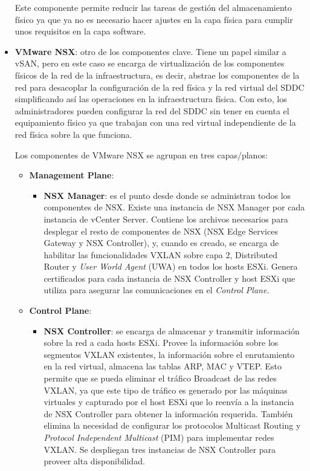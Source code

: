 \begin{itemize}
    Este componente permite reducir las tareas de gestión del almacenamiento físico ya que ya no es necesario hacer ajustes en la capa física para cumplir unos requisitos en la capa software.
    \item \textbf{VMware NSX}: otro de los componentes clave. Tiene un papel similar a vSAN, pero en este caso se encarga de virtualización de los componentes físicos de la red de la infraestructura, es decir, abstrae los componentes de la red para desacoplar la configuración de la red física y la red virtual del SDDC simplificando así las operaciones en la infraestructura física. Con esto, los administradores pueden configurar la red del SDDC sin tener en cuenta el equipamiento físico ya que trabajan con una red virtual independiente de la red física sobre la que funciona.

    Los componentes de VMware NSX se agrupan en tres capas/planos\cite{componentesNSX}:
    \begin{itemize}
        \item \textbf{Management Plane}: 
            \begin{itemize}
                \item \textbf{NSX Manager}: es el punto desde donde se administran todos los componentes de NSX. Existe una instancia de NSX Manager por cada instancia de vCenter Server. Contiene los archivos necesarios para desplegar el resto de componentes de NSX (NSX Edge Services Gateway y NSX Controller), y, cuando es creado, se encarga de habilitar las funcionalidades VXLAN sobre capa 2, Distributed Router y \textit{User World Agent} (UWA) en todos los hosts ESXi. Genera certificados para cada instancia de NSX Controller y host ESXi que utiliza para asegurar las comunicaciones en el \textit{Control Plane}.
            \end{itemize}
        \item \textbf{Control Plane}:
            \begin{itemize}
                \item \textbf{NSX Controller}: se encarga de almacenar y transmitir información sobre la red a cada hosts ESXi. Provee la información sobre los segmentos VXLAN existentes, la información sobre el enrutamiento en la red virtual, almacena las tablas ARP, MAC y VTEP. Esto permite que se pueda eliminar el tráfico Broadcast de las redes VXLAN, ya que este tipo de tráfico es generado por las máquinas virtuales y capturado por el host ESXi que lo reenvía a la instancia de NSX Controller para obtener la información requerida. También elimina la necesidad de configurar los protocolos Multicast Routing y \textit{Protocol Independent Multicast} (PIM) para implementar redes VXLAN. Se despliegan tres instancias de NSX Controller para proveer alta disponibilidad.

\end{itemize}
\end{itemize}
\end{itemize}
